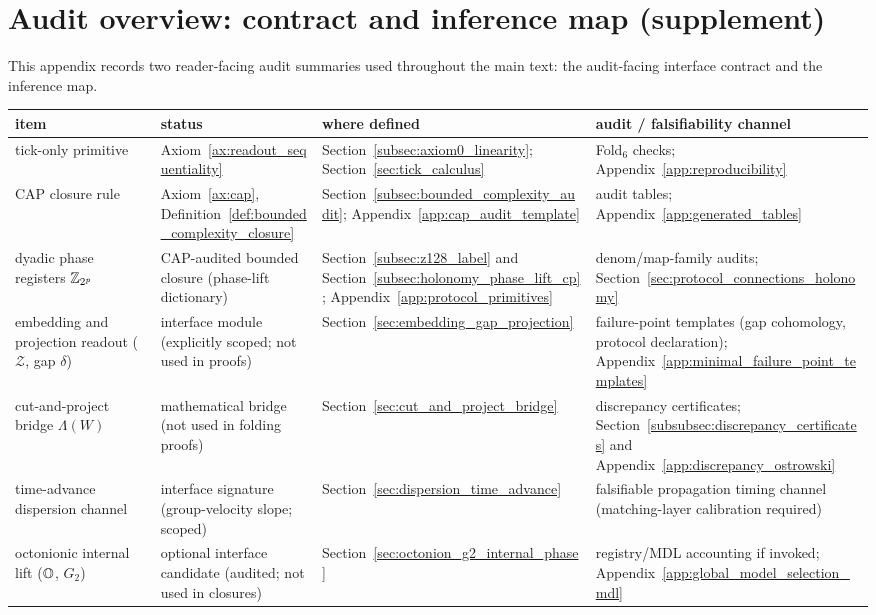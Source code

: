 \section{Audit overview: contract and inference map (supplement)}
\label{app:audit_overview}

This appendix records two reader-facing audit summaries used throughout the main text: the audit-facing interface contract and the inference map.

\begin{table}[t]
\centering
\scriptsize
\setlength{\tabcolsep}{5.5pt}
\renewcommand{\arraystretch}{1.15}
\begin{tabular}{p{} p{} p{} p{}}
\toprule
item & status & where defined & audit / falsifiability channel \\
\midrule
tick-only primitive & Axiom~\ref{ax:readout_sequentiality} & Section~\ref{subsec:axiom0_linearity}; Section~\ref{sec:tick_calculus} & Fold$_6$ checks; Appendix~\ref{app:reproducibility} \\
CAP closure rule & Axiom~\ref{ax:cap}, Definition~\ref{def:bounded_complexity_closure} & Section~\ref{subsec:bounded_complexity_audit}; Appendix~\ref{app:cap_audit_template} & audit tables; Appendix~\ref{app:generated_tables} \\
dyadic phase registers $\mathbb{Z}_{2^p}$ & CAP-audited bounded closure (phase-lift dictionary) & Section~\ref{subsec:z128_label} and Section~\ref{subsec:holonomy_phase_lift_cp}; Appendix~\ref{app:protocol_primitives} & denom/map-family audits; Section~\ref{sec:protocol_connections_holonomy} \\
embedding and projection readout ($\mathcal{Z}$, gap $\delta$) & interface module (explicitly scoped; not used in proofs) & Section~\ref{sec:embedding_gap_projection} & failure-point templates (gap cohomology, protocol declaration); Appendix~\ref{app:minimal_failure_point_templates} \\
cut-and-project bridge $\Lambda(W)$ & mathematical bridge (not used in folding proofs) & Section~\ref{sec:cut_and_project_bridge} & discrepancy certificates; Section~\ref{subsubsec:discrepancy_certificates} and Appendix~\ref{app:discrepancy_ostrowski} \\
time-advance dispersion channel & interface signature (group-velocity slope; scoped) & Section~\ref{sec:dispersion_time_advance} & falsifiable propagation timing channel (matching-layer calibration required) \\
octonionic internal lift ($\mathbb{O}$, $G_2$) & optional interface candidate (audited; not used in closures) & Section~\ref{sec:octonion_g2_internal_phase} & registry/MDL accounting if invoked; Appendix~\ref{app:global_model_selection_mdl} \\

\end{tabular}
\end{table}
